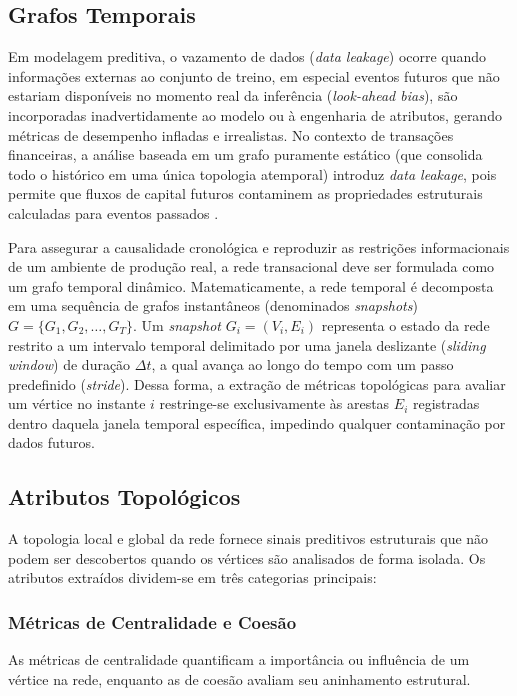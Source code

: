 \documentclass[a4paper,12pt,oneside,onecolumn,final,fleqn]{repUERJ}
\begin{document}
\subsection{Grafos Temporais}
\label{subsec:grafos_temporais}
Em modelagem preditiva, o vazamento de dados (\textit{data leakage}) ocorre quando informações externas ao conjunto de treino, em especial eventos futuros que não estariam disponíveis no momento real da inferência (\textit{look-ahead bias}), são incorporadas inadvertidamente ao modelo ou à engenharia de atributos, gerando métricas de desempenho infladas e irrealistas. No contexto de transações financeiras, a análise baseada em um grafo puramente estático (que consolida todo o histórico em uma única topologia atemporal) introduz \textit{data leakage}, pois permite que fluxos de capital futuros contaminem as propriedades estruturais calculadas para eventos passados \cite{sizan2025machine}.

Para assegurar a causalidade cronológica e reproduzir as restrições informacionais de um ambiente de produção real, a rede transacional deve ser formulada como um grafo temporal dinâmico. Matematicamente, a rede temporal é decomposta em uma sequência de grafos instantâneos (denominados \textit{snapshots}) $G = \{G_1, G_2, \ldots, G_T\}$. Um \textit{snapshot} $G_i = (V_i, E_i)$ representa o estado da rede restrito a um intervalo temporal delimitado por uma janela deslizante (\textit{sliding window}) de duração $\Delta t$, a qual avança ao longo do tempo com um passo predefinido (\textit{stride}). Dessa forma, a extração de métricas topológicas para avaliar um vértice no instante $i$ restringe-se exclusivamente às arestas $E_i$ registradas dentro daquela janela temporal específica, impedindo qualquer contaminação por dados futuros.

\subsection{Atributos Topológicos}
A topologia local e global da rede fornece sinais preditivos estruturais que não podem ser descobertos quando os vértices são analisados de forma isolada. Os atributos extraídos dividem-se em três categorias principais:

\subsubsection{Métricas de Centralidade e Coesão}
As métricas de centralidade quantificam a importância ou influência de um vértice na rede, enquanto as de coesão avaliam seu aninhamento estrutural.
\end{document}
